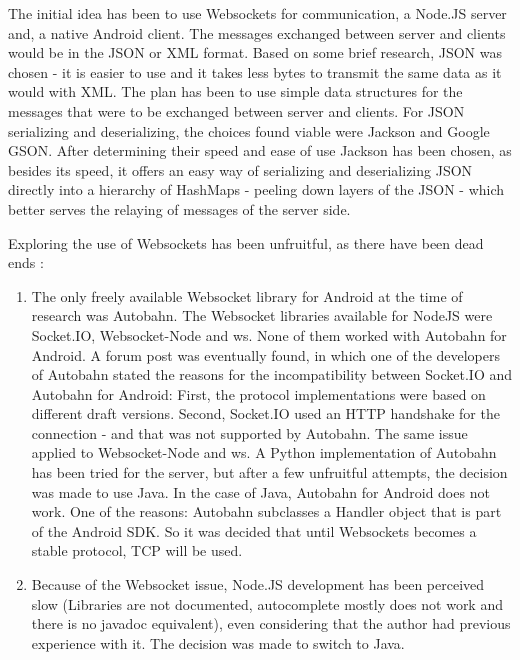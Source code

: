 The initial idea has been to use Websockets for communication, a Node.JS server
and, a native Android client. The messages exchanged between server and clients
would be in the JSON or XML format. Based on some brief research, JSON was
chosen - it is easier to use and it takes less bytes to transmit the same data
as it would with XML. The plan has been to use simple data structures for the
messages that were to be exchanged between server and clients. For JSON
serializing and deserializing, the choices found viable were Jackson and
Google GSON. After determining their speed and ease of use Jackson has been
chosen, as besides its speed, it offers an easy way of serializing and
deserializing JSON directly into a hierarchy of HashMaps - peeling down layers
of the JSON - which better serves the relaying of messages of the server side.
\newline

Exploring the use of Websockets has been unfruitful, as there have been dead
ends :

\begin{enumerate}
  \item The only freely available Websocket library for Android at the time of
  research was Autobahn. The Websocket libraries available for NodeJS were
  Socket.IO, Websocket-Node and ws. None of them worked with Autobahn for
  Android. A forum post was eventually found, in which one of the developers of
  Autobahn stated the reasons for the incompatibility between Socket.IO and
  Autobahn for Android: First, the protocol implementations were based on
  different draft versions. Second, Socket.IO used an HTTP handshake for the
  connection - and that was not supported by Autobahn. The same issue applied to
  Websocket-Node and ws. A Python implementation of Autobahn has been tried for
  the server, but after a few unfruitful attempts, the decision was made to
  use Java. In the case of Java, Autobahn for Android does not work. One of the
  reasons: Autobahn subclasses a Handler object that is part of the Android
  SDK. So it was decided that until Websockets becomes a stable protocol, TCP
  will be used.
  
  \item Because of the Websocket issue, Node.JS development has been perceived
  slow (Libraries are not documented, autocomplete mostly does not work and
  there is no javadoc equivalent), even considering that the author had
  previous experience with it. The decision was made to switch to Java.  
\end{enumerate}

